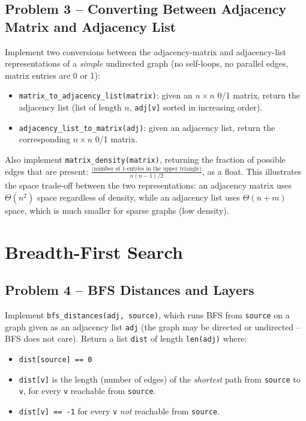 \documentclass[11pt]{article}
\begin{document}
\subsection*{Problem 3 -- Converting Between Adjacency Matrix and Adjacency List}

Implement two conversions between the adjacency-matrix and adjacency-list
representations of a \emph{simple} undirected graph (no self-loops, no parallel edges,
matrix entries are 0 or 1):

\begin{itemize}
    \item \texttt{matrix\_to\_adjacency\_list(matrix)}: given an $n \times n$ 0/1 matrix,
    return the adjacency list (list of length $n$, \texttt{adj[v]} sorted in increasing
    order).
    \item \texttt{adjacency\_list\_to\_matrix(adj)}: given an adjacency list, return the
    corresponding $n \times n$ 0/1 matrix.
\end{itemize}

Also implement \texttt{matrix\_density(matrix)}, returning the fraction of possible edges
that are present: $\frac{\text{(number of 1-entries in the upper triangle)}}{n(n-1)/2}$,
as a float. This illustrates the space trade-off between the two representations: an
adjacency matrix uses $\Theta(n^2)$ space regardless of density, while an adjacency list
uses $\Theta(n+m)$ space, which is much smaller for sparse graphs (low density).

\newpage
\section{Breadth-First Search}

\subsection*{Problem 4 -- BFS Distances and Layers}

Implement \texttt{bfs\_distances(adj, source)}, which runs BFS from \texttt{source} on a
graph given as an adjacency list \texttt{adj} (the graph may be directed or undirected --
BFS does not care). Return a list \texttt{dist} of length \texttt{len(adj)} where:
\begin{itemize}
    \item \texttt{dist[source] == 0}
    \item \texttt{dist[v]} is the length (number of edges) of the \emph{shortest} path
    from \texttt{source} to \texttt{v}, for every \texttt{v} reachable from
    \texttt{source}.
    \item \texttt{dist[v] == -1} for every \texttt{v} \emph{not} reachable from
    \texttt{source}.
\end{itemize}
\end{document}
